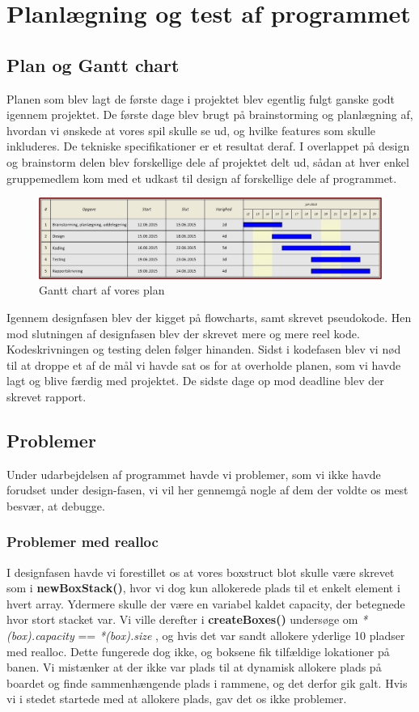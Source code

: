 \section{Planlægning og test af programmet}
\subsection{Plan og Gantt chart}
Planen som blev lagt de første dage i projektet blev egentlig fulgt ganske godt igennem projektet. De første dage blev brugt på brainstorming og planlægning af, hvordan vi ønskede at vores spil skulle se ud, og hvilke features som skulle inkluderes. De tekniske specifikationer er et resultat deraf. I overlappet på design og brainstorm delen blev forskellige dele af projektet delt ud, sådan at hver enkel gruppemedlem kom med et udkast til design af forskellige dele af programmet.
\begin{figure}[h]
\begin{center}
\includegraphics[scale=0.7]{img/Gantt_Chart.png}
\caption{Gantt chart af vores plan}
\end{center}
\end{figure}
 Igennem designfasen blev der kigget på flowcharts, samt skrevet pseudokode. Hen mod slutningen af designfasen blev der skrevet mere og mere reel kode. Kodeskrivningen og testing delen følger hinanden. Sidst i kodefasen blev vi nød til at droppe et af de mål vi havde sat os for at overholde planen, som vi havde lagt og blive færdig med projektet.  De sidste dage op mod deadline blev der skrevet rapport.
\subsection{Problemer}
Under udarbejdelsen af programmet havde vi problemer, som vi ikke havde forudset under design-fasen, vi vil her gennemgå nogle af dem der voldte os mest besvær, at debugge.
\subsubsection{Problemer med realloc}
\label{reallocfejl}
I designfasen havde vi forestillet os at vores boxstruct blot skulle være skrevet som i \textbf{newBoxStack()}, hvor vi dog kun allokerede plads til et enkelt element i hvert array. Ydermere skulle der være en variabel kaldet capacity, der betegnede hvor stort stacket var. Vi ville derefter i \textbf{createBoxes()} undersøge om \textit{*(box).capacity} == \textit{*(box).size} , og hvis det var sandt allokere yderlige 10 pladser med realloc. Dette fungerede dog ikke, og boksene fik tilfældige lokationer på banen. Vi mistænker at der ikke var plads til at dynamisk allokere plads på boardet og finde sammenhængende plads i rammene, og det derfor gik galt. Hvis vi i stedet startede med at allokere plads, gav det os ikke problemer.
